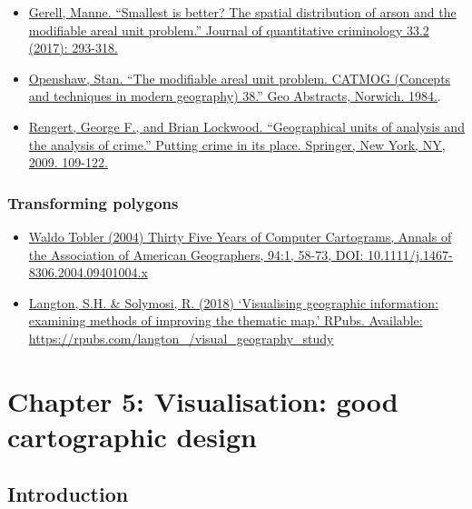 \documentclass[
]{book}
\providecommand{\tightlist}{%
  \setlength{\itemsep}{0pt}\setlength{\parskip}{0pt}}
\begin{document}
\begin{itemize}
\tightlist
\item
  \href{https://link.springer.com/article/10.1007/s10940-016-9297-6}{Gerell, Manne. ``Smallest is better? The spatial distribution of arson and the modifiable areal unit problem.'' Journal of quantitative criminology 33.2 (2017): 293-318.}
\item
  \href{https://www.uio.no/studier/emner/sv/iss/SGO9010/openshaw1983.pdf}{Openshaw, Stan. ``The modifiable areal unit problem. CATMOG (Concepts and techniques in modern geography) 38.'' Geo Abstracts, Norwich. 1984.}.
\item
  \href{https://link.springer.com/chapter/10.1007/978-0-387-09688-9_5}{Rengert, George F., and Brian Lockwood. ``Geographical units of analysis and the analysis of crime.'' Putting crime in its place. Springer, New York, NY, 2009. 109-122.}
\end{itemize}

\hypertarget{transforming-polygons-1}{%
\subsection{Transforming polygons}\label{transforming-polygons-1}}

\begin{itemize}
\tightlist
\item
  \href{https://www.tandfonline.com/doi/full/10.1111/j.1467-8306.2004.09401004.x}{Waldo Tobler (2004) Thirty Five Years of Computer Cartograms, Annals of the Association of American Geographers, 94:1, 58-73, DOI: 10.1111/j.1467-8306.2004.09401004.x}
\item
  \href{https://rpubs.com/langton_/visual_geography_study}{Langton, S.H. \& Solymosi, R. (2018) `Visualising geographic information: examining methods of improving the thematic map.' RPubs. Available: https://rpubs.com/langton\_/visual\_geography\_study}
\end{itemize}

\hypertarget{chapter-5-visualisation-good-cartographic-design}{%
\chapter{Chapter 5: Visualisation: good cartographic design}\label{chapter-5-visualisation-good-cartographic-design}}

\hypertarget{introduction-4}{%
\section{Introduction}\label{introduction-4}}
\end{document}
